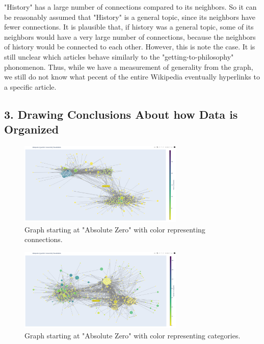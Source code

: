 \documentclass[fontsize=11pt]{article}
\begin{document}
	"History" has a large number of connections compared to its neighbors. So it can be reasonably assumed that "History" is a general topic, since its neighbors have fewer connections. It is plausible that, if history was a general topic, some of its neighbors would have a very large number of connections, because the neighbors of history would be connected to each other. However, this is note the case. It is still unclear which articles behave similarly to the "getting-to-philosophy" phonomenon. Thus, while we have a measurement of generality from the graph, we still do not know what pecent of the entire Wikipedia eventually hyperlinks to a specific article.
	
	
	\subsection*{3. Drawing Conclusions About how Data is Organized}
	
	
	
	\begin{figure}[h!]
    \begin{center}
  		\includegraphics[width=0.7\textwidth]{AbsoluteZeroConnections.png}
  		\caption{Graph starting at "Absolute Zero" with color representing connections.}
  		\label{fig:}
  	\end{center}
	\end{figure}
	
	 \begin{figure}[h!]
    \begin{center}
  		\includegraphics[width=0.7\textwidth]{AbsoluteZeroCategories.png}
  		\caption{Graph starting at "Absolute Zero" with color representing categories.}
  		\label{fig:}
  	\end{center}
	\end{figure}
	
\end{document}
